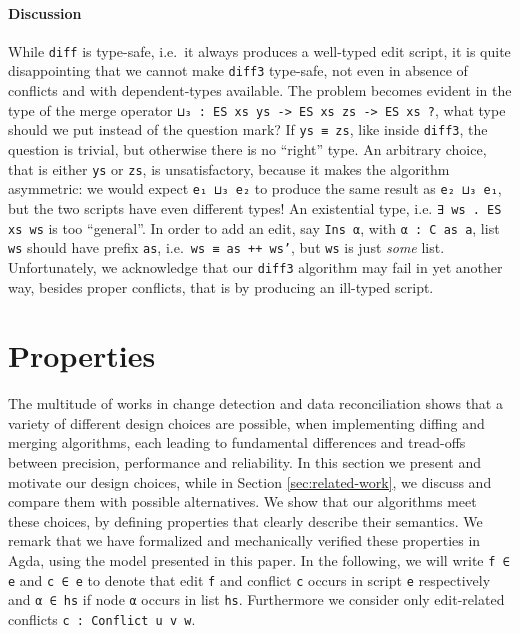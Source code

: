 \documentclass{sigplanconf}
\theoremstyle{plain}
\begin{document}
\paragraph{Discussion}
While \texttt{diff} is type-safe, i.e.\ it always produces a
well-typed edit script, it is quite disappointing that we cannot make
\texttt{diff3} type-safe, not even in absence of conflicts and with
dependent-types available.
%
The problem becomes evident in the type of the merge operator
\texttt{⊔₃ : ES xs ys -> ES xs zs -> ES xs ?}, what type should we put
instead of the question mark?
%
If \texttt{ys ≡ zs}, like inside \texttt{diff3}, the question is
trivial, but otherwise there is no ``right'' type.
%
An arbitrary choice, that is either \texttt{ys} or \texttt{zs}, is
unsatisfactory, because it makes the algorithm asymmetric: we would
expect \texttt{e₁ ⊔₃ e₂} to produce the same result as \texttt{e₂ ⊔₃
  e₁}, but the two scripts have even different types!
%
An existential type, i.e. \texttt{∃ ws . ES xs ws} is too ``general''.
In order to add an edit, say \texttt{Ins α}, with \texttt{α : C as a},
list \texttt{ws} should have prefix \texttt{as}, i.e.\ \texttt{ws ≡ as
  ++ ws'}, but \texttt{ws} is just \emph{some} list.
%
Unfortunately, we acknowledge that our \texttt{diff3} algorithm may
fail in yet another way, besides proper conflicts, that is by
producing an ill-typed script.

\section{Properties}
\label{sec:properties}
%
The multitude of works in change detection and data reconciliation
\cite{...} shows that a variety of different design choices are
possible, when implementing diffing and merging algorithms, each
leading to fundamental differences and tread-offs between precision,
performance and reliability.
%
In this section we present and motivate our design choices, while in
Section \ref{sec:related-work}, we discuss and compare them with
possible alternatives.
%
We show that our algorithms meet these choices, by defining properties
that clearly describe their semantics.
%
We remark that we have formalized and mechanically verified these
properties in Agda, using the model presented in this paper.
%
In the following, we will write \texttt{f ∈ e} and \texttt{c ∈ e} to
denote that edit \texttt{f} and conflict \texttt{c} occurs in script
\texttt{e} respectively and \texttt{α ∈ hs} if node \texttt{α}
occurs in list \texttt{hs}.
%
Furthermore we consider only edit-related conflicts \texttt{c :
  Conflict u v w}.
  
\end{document}
